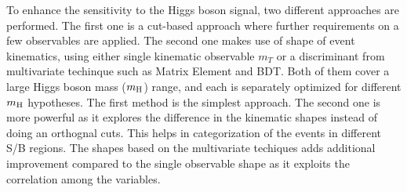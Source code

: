 To enhance the sensitivity to the Higgs boson signal, two different approaches 
are performed. The first one is a cut-based approach where further requirements 
on a few observables are applied. The second one makes use of shape of 
event kinematics, using either single kinematic observable $m_T$ or 
a discriminant from multivariate techinque such as Matrix Element and BDT. 
Both of them cover a large Higgs boson mass ($m_{\rm{H}}$) range, 
and each is separately optimized for different
$m_{\rm{H}}$ hypotheses. The first method is the simplest approach. 
The second one is more powerful as it explores the difference in the kinematic 
shapes instead of doing an orthognal cuts. This helps in categorization of the 
events in different S/B regions. 
The shapes based on the multivariate techiques adds additional improvement 
compared to the single observable shape as it exploits the 
correlation among the variables. 
		







